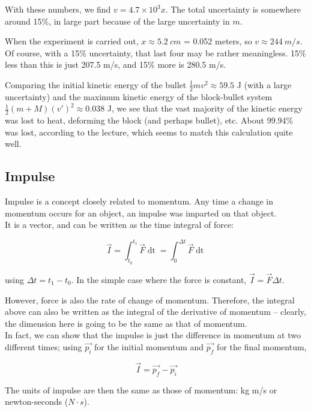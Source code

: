 With these numbers, we find $v = 4.7 \times 10^{3} x$. The total uncertainty is somewhere around 15\%, in large part because of the large uncertainty in $m$.

When the experiment is carried out, $x \approx \SI{5.2}{cm}$ = 0.052 meters, so $v \approx \SI{244}{m/s}$. Of course, with a 15\% uncertainty, that last four may be rather meaningless. 15\% less than this is just 207.5 m/s, and 15\% more is 280.5 m/s.

Comparing the initial kinetic energy of the bullet $\displaystyle \frac{1}{2} m v^2 \approx 59.5$ J (with a large uncertainty) and the maximum kinetic energy of the block-bullet system $\displaystyle \frac{1}{2} (m + M) (v')^2 \approx 0.038$ J, we see that the vast majority of the kinetic energy was lost to heat, deforming the block (and perhaps bullet), etc. About 99.94\% was lost, according to the lecture, which seems to match this calculation quite well.

\subsection{Impulse}

Impulse is a concept closely related to momentum. Any time a change in momentum occurs for an object, an impulse was imparted on that object.\\
It is a vector, and can be written as the time integral of force:

\begin{equation}
\vec{I} = \int_{t_0}^{t_1} \vec{F} \mathop{dt} = \int_0^{\Delta t} \vec{F} \mathop{dt}
\end{equation}

using $\Delta t = t_1 - t_0$. In the simple case where the force is constant, $\vec{I} = \vec{F} \Delta t$.

However, force is also the rate of change of momentum. Therefore, the integral above can also be written as the integral of the derivative of momentum -- clearly, the dimension here is going to be the same as that of momentum.\\
In fact, we can show that the impulse is just the difference in momentum at two different times; using $\vec{p_i}$ for the initial momentum and $\vec{p_f}$ for the final momentum, 

\begin{equation}
\vec{I} = \vec{p_f} - \vec{p_i}
\end{equation}

The units of impulse are then the same as those of momentum: kg m/s or newton-seconds ($N \cdot s$).

